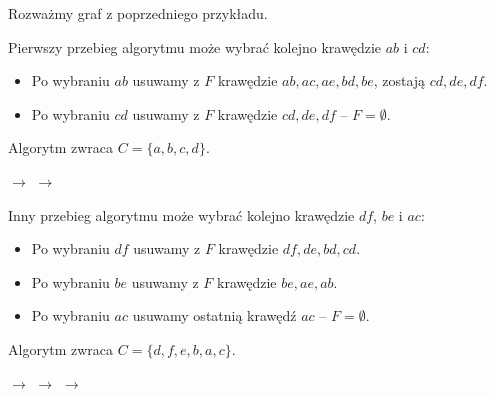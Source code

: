 \begin{example}
	Rozważmy graf z poprzedniego przykładu.

	Pierwszy przebieg algorytmu może wybrać kolejno krawędzie $ab$ i $cd$:
	\begin{itemize}[nosep]
		\item Po wybraniu $ab$ usuwamy z $F$ krawędzie $ab, ac, ae, bd, be$, zostają $cd, de, df$.
		\item Po wybraniu $cd$ usuwamy z $F$ krawędzie $cd, de, df$ -- $F = \emptyset$.
	\end{itemize}
	Algorytm zwraca $C = \{a, b, c, d\}$.
	\begin{center}
		\;$\rightarrow$\;%
		\;$\rightarrow$\;%
	\end{center}

	Inny przebieg algorytmu może wybrać kolejno krawędzie $df$, $be$ i $ac$:
	\begin{itemize}[nosep]
		\item Po wybraniu $df$ usuwamy z $F$ krawędzie $df, de, bd, cd$.
		\item Po wybraniu $be$ usuwamy z $F$ krawędzie $be, ae, ab$.
		\item Po wybraniu $ac$ usuwamy ostatnią krawędź $ac$ -- $F = \emptyset$.
	\end{itemize}
	Algorytm zwraca $C = \{d, f, e, b, a, c\}$.
	\begin{center}
		\;$\rightarrow$\;%
		\;$\rightarrow$\;%
		\;$\rightarrow$\;%
	\end{center}
\end{example}
